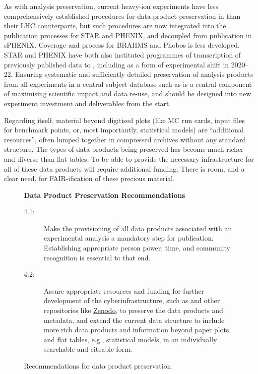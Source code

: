 \documentclass[11pt]{article}
\begin{document}
As with \gls{analysis preservation}, current heavy-ion experiments have less comprehensively established procedures for data-product preservation in \hepdata than their \gls{LHC} counterparts, but such procedures are now integrated into the publication processes for \gls{STAR} and \gls{PHENIX}, and decoupled from publication in \gls{sPHENIX}. Coverage and process for BRAHMS and Phobos is less developed. \gls{STAR} and \gls{PHENIX} have both also instituted programmes of transcription of previously published data to \hepdata, including as a form of experimental shift in 2020--22. Ensuring systematic and sufficiently detailed preservation of analysis products from all experiments in a central subject database such as \hepdata is a central component of maximising scientific impact and data re-use, and should be designed into new experiment investment and deliverables from the start. 

Regarding \hepdata itself, material beyond digitised plots (like MC run cards, input files for benchmark points, or, most importantly, statistical models) are ``additional resources'', often lumped together in compressed archives without any standard structure.
The types of data products being preserved has become much richer and diverse than flat tables.
To be able to provide the necessary infrastructure for all of these data products will require additional funding.
There is room, and a clear need, for \gls{FAIR}-ification of these precious material.

\begin{figure}[!ht]
\begin{tcolorbox}
\begin{center}
{\large \textbf{Data Product Preservation Recommendations}}
\end{center}
%
\begin{description}
   \item[4.1:] Make the provisioning of all \glspl{data product} associated with an experimental analysis a mandatory step for publication.
   Establishing appropriate person power, time, and community recognition is essential to that end.
   \item[4.2:] Assure appropriate resources and funding for further development of the cyberinfrastructure, such as \href{https://www.hepdata.net/}{\hepdata} and other repositories like \href{https://zenodo.org}{Zenodo}, to preserve the data products and metadata, and extend the current data structure to include more rich data products and information beyond paper plots and flat tables, e.g., statistical models, in an individually searchable and citeable form.
\end{description}
\end{tcolorbox}
\caption{Recommendations for data product preservation.}
\label{fig:recs_datapreservation}
\end{figure}
\end{document}

